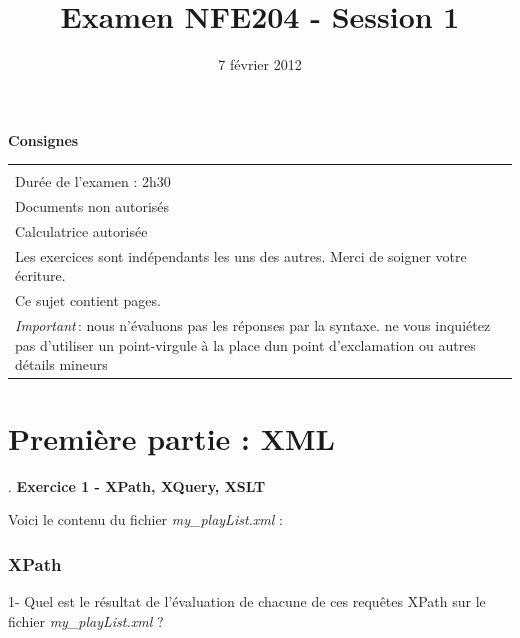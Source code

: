 \documentclass[9pt,a4paper]{article}
\begin{document}
\title{Examen NFE204 - Session 1}
\date{7 f\'evrier 2012}

\maketitle

\begin{center}
{\bf \Large Consignes}\\
\begin{tabular}{| p{15cm} |}
\hline
\\
Dur\'ee de l'examen : 2h30\\
Documents non autoris\'es\\
Calculatrice autoris\'ee\\
Les exercices sont ind\'ependants les uns des autres. Merci de soigner votre \'ecriture.\\
Ce sujet contient \pageref{LastPage} pages.\\


\textit{Important}\,: nous n'évaluons pas les réponses par la syntaxe. ne vous
inquiétez pas d'utiliser un point-virgule à la place dun point d'exclamation ou
autres détails mineurs
\\
\hline
\end{tabular}
\end{center}

\pagebreak

\section*{Première partie : XML}
. 
\textbf{\Large Exercice 1 - XPath, XQuery, XSLT}

Voici le contenu du fichier \textit{my\_playList.xml} :
\vspace{-0.05cm} 


\subsubsection*{XPath}
1- Quel est le r\'esultat de l'\'evaluation de chacune de ces requêtes XPath
 sur le fichier \textit{my\_playList.xml} ?
\end{document}
